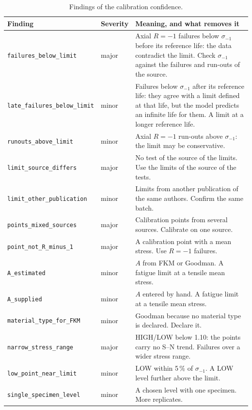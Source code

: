 \documentclass[11pt,a4paper]{article}
\newcommand{\sigm}{\sigma_{-1}}
\newcommand{\code}[1]{\texttt{#1}}
\begin{document}
\begin{table}[htbp]
\centering
\caption{Findings of the calibration confidence.}
\label{tab:findings}
\small
\renewcommand{\arraystretch}{1.25}
\begin{tabularx}{\textwidth}{
    @{}
    >{\raggedright\arraybackslash}p{}
    >{\centering\arraybackslash}p{}
    >{\raggedright\arraybackslash}X
    @{}
}
\toprule
\textbf{Finding} & \textbf{Severity} & \textbf{Meaning, and what removes it} \\
\midrule
\code{failures\_below\_limit} & major & Axial $R=-1$ failures below $\sigm$ before its reference life: the data
contradict the limit. Check $\sigm$ against the failures and run-outs of the source. \\
\code{late\_failures\_below\_limit} & minor & Failures below $\sigm$ after its reference life: they agree with a limit
defined at that life, but the model predicts an infinite life for them. A limit at a longer reference life. \\
\code{runouts\_above\_limit} & minor & Axial $R=-1$ run-outs above $\sigm$: the limit may be conservative. \\
\code{limit\_source\_differs} & major & No test of the source of the limits. Use the limits of the source of the
tests. \\
\code{limit\_other\_publication} & minor & Limits from another publication of the same authors. Confirm the same
batch. \\
\code{points\_mixed\_sources} & major & Calibration points from several sources. Calibrate on one source. \\
\code{point\_not\_R\_minus\_1} & major & A calibration point with a mean stress. Use $R=-1$ failures. \\
\code{A\_estimated} & minor & $A$ from FKM or Goodman. A fatigue limit at a tensile mean stress. \\
\code{A\_supplied} & minor & $A$ entered by hand. A fatigue limit at a tensile mean stress. \\
\code{material\_type\_for\_FKM} & minor & Goodman because no material type is declared. Declare it. \\
\code{narrow\_stress\_range} & major & HIGH/LOW below 1.10: the points carry no S--N trend. Failures over a wider
stress range. \\
\code{low\_point\_near\_limit} & minor & LOW within 5\,\% of $\sigm$. A LOW level further above the limit. \\
\code{single\_specimen\_level} & minor & A chosen level with one specimen. More replicates. \\

\end{tabularx}
\end{table}
\end{document}
